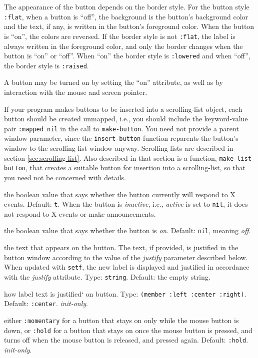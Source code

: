 \documentclass[twoside,openright,11pt]{report}
\newcommand{\tp}[1]{\texttt{#1}}
\begin{document}
The appearance of the button depends on the border style.  For the
button style \tp{:flat}, when a button is ``off'', the background is
the button's background color and the text, if any, is written in the
button's foreground color.  When the button is ``on'', the colors are
reversed.  If the border style is not \tp{:flat}, the label is always
written in the foreground color, and only the border changes when the
button is ``on'' or ``off''.  When ``on'' the border style is
\tp{:lowered} and when ``off'', the border style is \tp{:raised}.

A button may be turned on by setting the ``on'' attribute, as well as
by interaction with the mouse and screen pointer.

If your program makes buttons to be inserted into a scrolling-list
object, each button should be created unmapped, i.e., you should
include the keyword-value pair \tp{:mapped nil} in the call to
\tp{make-button}.  You need not provide a parent window parameter,
since the \tp{insert-button} function reparents the button's
window to the scrolling-list window anyway.  Scrolling lists are
described in section \ref{sec:scrolling-list}.  Also described in that
section is a function, \tp{make-list-button}, that creates a
suitable button for insertion into a scrolling-list, so that you need
not be concerned with details.


{the boolean value that says whether the button currently will respond
to X events.  Default: \tp{t}.  When the button is \emph{inactive},
i.e., \emph{active} is set to \tp{nil}, it does not respond to X
events or make announcements.}

{the boolean value that says whether the button is \textit{on}.
Default: \tp{nil}, meaning \textit{off}.}

{the text that appears on the button.  The text, if provided, is
justified in the button window according to the value of the
\emph{justify} parameter described below.  When updated with
\tp{setf}, the new label is displayed and justified in accordance
with the \emph{justify} attribute.  Type: \tp{string}.  Default:
the empty string.}

{how label text is justified` on button.  Type:
\tp{(member~:left~:center~:right)}.  Default: \tp{:center}.
\emph{init-only}.}

{either \tp{:momentary} for a button that stays on only while the
mouse button is down, or \tp{:hold} for a button that stays on
once the mouse button is pressed, and turns off when the mouse button
is released, and pressed again.  Default: \tp{:hold}.
\textit{init-only}.}
\end{document}
